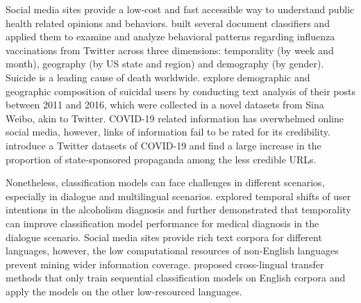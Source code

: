 Social media sites provide a low-cost and fast accessible way to understand public health related opinions and behaviors. \cite{huang2017examining, huang2019can} built several document classifiers and applied them to examine and analyze behavioral patterns regarding influenza vaccinations from Twitter across three dimensions: temporality (by week and month), geography (by US state and region) and demography (by gender).
Suicide is a leading cause of death worldwide. \cite{huang2017exploring} explore demographic and geographic composition of suicidal users by conducting text analysis of their posts between 2011 and 2016, which were collected in a novel datasets from Sina Weibo, akin to Twitter.
COVID-19 related information has overwhelmed online social media, however, links of information fail to be rated for its credibility. \cite{broniatowski2020covid, huang2020coronavirus} introduce a Twitter datasets of COVID-19 and find a large increase in the proportion of state-sponsored propaganda among the less credible URLs.

Nonetheless, classification models can face challenges in different scenarios, especially in dialogue and multilingual scenarios. \cite{huang2018modeling} explored temporal shifts of user intentions in the alcoholism diagnosis and further demonstrated that temporality can improve classification model performance for medical diagnosis in the dialogue scenario.
Social media sites provide rich text corpora for different languages, however, the low computational resources of non-English languages prevent mining wider information coverage. 
\cite{huang2019matters} proposed cross-lingual transfer methods that only train sequential classification models on English corpora and apply the models on the other low-resourced languages.